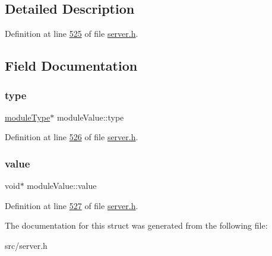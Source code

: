 \subsection{Detailed Description}


Definition at line \hyperlink{server_8h_source_l00525}{525} of file \hyperlink{server_8h_source}{server.\+h}.



\subsection{Field Documentation}
\mbox{\label{structmoduleValue_a018030bdef293e270f1cb07a3d9ec41b}} 
\subsubsection{\texorpdfstring{type}{type}}
{\footnotesize\ttfamily \hyperlink{structRedisModuleType}{module\+Type}$\ast$ module\+Value\+::type}



Definition at line \hyperlink{server_8h_source_l00526}{526} of file \hyperlink{server_8h_source}{server.\+h}.

\mbox{\label{structmoduleValue_ab1e8fd55bbd6d21c650d3a363a559bb8}} 
\subsubsection{\texorpdfstring{value}{value}}
{\footnotesize\ttfamily void$\ast$ module\+Value\+::value}



Definition at line \hyperlink{server_8h_source_l00527}{527} of file \hyperlink{server_8h_source}{server.\+h}.



The documentation for this struct was generated from the following file\+:\begin{DoxyCompactItemize}
\item 
src/server.\+h\end{DoxyCompactItemize}
